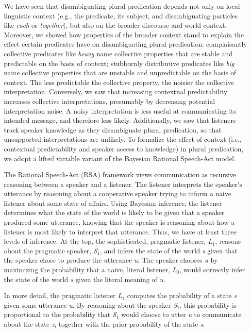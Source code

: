 \documentclass[linguex]{sp}
\begin{document}
We have seen that disambiguating plural predication depends not only on local linguistic context (e.g., the predicate, its subject, and disambiguating particles like \emph{each} or \emph{together}), but also on the broader discourse and world context. Moreover, we showed how properties of the broader context stand to explain the effect certain predicates have on disambiguating plural predication: complaisantly collective predicates like \emph{heavy} name collective properties that are stable and predictable on the basis of context; stubbornly distributive predicates like \emph{big} name collective properties that are unstable and unpredictable on the basis of context. The less predictable the collective property, the noisier the collective interpretation. Conversely, we saw that increasing contextual predictability increases collective interpretations, presumably by decreasing potential interpretation noise. A noisy interpretation is less useful at communicating its intended message, and therefore less likely. Additionally, we saw that listeners track speaker knowledge as they disambiguate plural predication, so that unsupported interpretations are unlikely. To formalize the effect of context (i.e., contextual predictability and speaker access to knowledge) in plural predication, we adopt a lifted variable variant of the Bayesian Rational Speech-Act model. 

The Rational Speech-Act (RSA) framework views communication as recursive reasoning between a speaker and a listener. The listener interprets the speaker's utterance by reasoning about a cooperative speaker trying to inform a naive listener about some state of affairs. Using Bayesian inference, the listener determines what the state of the world is likely to be given that a speaker produced some utterance, knowing that the speaker is reasoning about how a listener is most likely to interpret that utterance. Thus, we have at least three levels of inference. At the top, the sophisticated, pragmatic listener, \emph{L}$_{1}$, reasons about the pragmatic speaker, \emph{S}$_{1}$, and infers the state of the world \emph{s} given that the speaker chose to produce the utterance \emph{u}. The speaker chooses \emph{u} by maximizing the probability that a naive, literal listener, \emph{L}$_{0}$, would correctly infer the state of the world \emph{s} given the literal meaning of \emph{u}.

In more detail, the pragmatic listener \emph{L}$_{1}$ computes the probability of a state \emph{s} given some utterance \emph{u}. By reasoning about the speaker \emph{S}$_{1}$, this probability is proportional to the probability that \emph{S}$_{1}$ would choose to utter \emph{u} to communicate about the state \emph{s}, together with the prior probability of the state \emph{s}.
\end{document}
